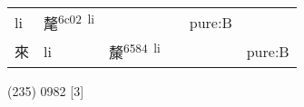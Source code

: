 \documentclass[14pt,a4paper]{scrartcl}
\begin{document}
\begin{longtable}[c]{@{}llllll@{}}
\begin{minipage}[t]{0.14\columnwidth}
li
\strut\end{minipage} &
\begin{minipage}[t]{0.14\columnwidth}\raggedright\strut
氂\textsuperscript{6c02~li}
\strut\end{minipage} &
\begin{minipage}[t]{0.14\columnwidth}\raggedright\strut
\strut\end{minipage} &
\begin{minipage}[t]{0.14\columnwidth}\raggedright\strut
\strut\end{minipage} &
\begin{minipage}[t]{0.14\columnwidth}\raggedright\strut
pure:B
\strut\end{minipage}\tabularnewline
\begin{minipage}[t]{0.14\columnwidth}\raggedright\strut
來
\strut\end{minipage} &
\begin{minipage}[t]{0.14\columnwidth}\raggedright\strut
li
\strut\end{minipage} &
\begin{minipage}[t]{0.14\columnwidth}\raggedright\strut
斄\textsuperscript{6584~li}
\strut\end{minipage} &
\begin{minipage}[t]{0.14\columnwidth}\raggedright\strut
\strut\end{minipage} &
\begin{minipage}[t]{0.14\columnwidth}\raggedright\strut
\strut\end{minipage} &
\begin{minipage}[t]{0.14\columnwidth}\raggedright\strut
pure:B
\strut\end{minipage}\tabularnewline
\bottomrule
\end{longtable}

(235) 0982 {[}3{]}
\end{document}
